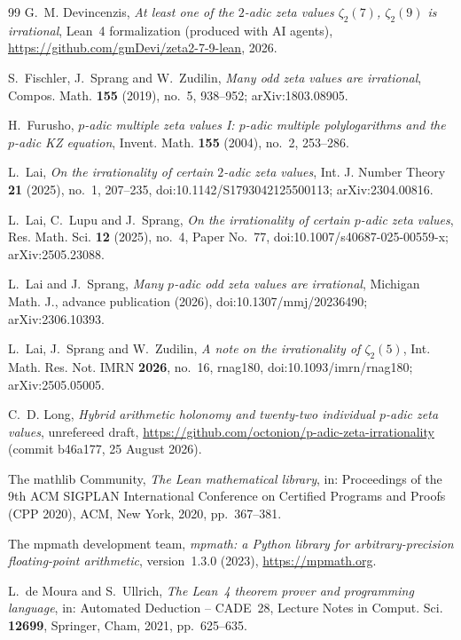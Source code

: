 \documentclass{amsart}
\theoremstyle{definition}
\theoremstyle{remark}
\numberwithin{equation}{section}
\begin{document}
\begin{thebibliography}{99}
G.~M. Devincenzis, \emph{At least one of the $2$-adic zeta values $\zeta_2(7)$,
$\zeta_2(9)$ is irrational}, Lean~4 formalization (produced with AI agents),
\url{https://github.com/gmDevi/zeta2-7-9-lean}, 2026.

S.~Fischler, J.~Sprang and W.~Zudilin, \emph{Many odd zeta values are
irrational}, Compos. Math. \textbf{155} (2019), no.~5, 938--952;
arXiv:1803.08905.

H.~Furusho, \emph{$p$-adic multiple zeta values I: $p$-adic multiple
polylogarithms and the $p$-adic KZ equation}, Invent. Math. \textbf{155}
(2004), no.~2, 253--286.

L.~Lai, \emph{On the irrationality of certain $2$-adic zeta values}, Int. J.
Number Theory \textbf{21} (2025), no.~1, 207--235,
doi:10.1142/S1793042125500113; arXiv:2304.00816.

L.~Lai, C.~Lupu and J.~Sprang, \emph{On the irrationality of certain $p$-adic
zeta values}, Res. Math. Sci. \textbf{12} (2025), no.~4, Paper No.~77,
doi:10.1007/s40687-025-00559-x; arXiv:2505.23088.

L.~Lai and J.~Sprang, \emph{Many $p$-adic odd zeta values are irrational},
Michigan Math. J., advance publication (2026), doi:10.1307/mmj/20236490;
arXiv:2306.10393.

L.~Lai, J.~Sprang and W.~Zudilin, \emph{A note on the irrationality of
$\zeta_2(5)$}, Int. Math. Res. Not. IMRN \textbf{2026}, no.~16, rnag180,
doi:10.1093/imrn/rnag180; arXiv:2505.05005.

C.~D. Long, \emph{Hybrid arithmetic holonomy and twenty-two individual $p$-adic
zeta values}, unrefereed draft,
\url{https://github.com/octonion/p-adic-zeta-irrationality} (commit b46a177,
25 August 2026).

The mathlib Community, \emph{The Lean mathematical library}, in: Proceedings
of the 9th ACM SIGPLAN International Conference on Certified Programs and
Proofs (CPP 2020), ACM, New York, 2020, pp.~367--381.

The mpmath development team, \emph{mpmath: a Python library for
arbitrary-precision floating-point arithmetic}, version~1.3.0 (2023),
\url{https://mpmath.org}.

L.~de Moura and S.~Ullrich, \emph{The Lean~4 theorem prover and programming
language}, in: Automated Deduction -- CADE~28, Lecture Notes in Comput. Sci.
\textbf{12699}, Springer, Cham, 2021, pp.~625--635.


\end{thebibliography}
\end{document}
